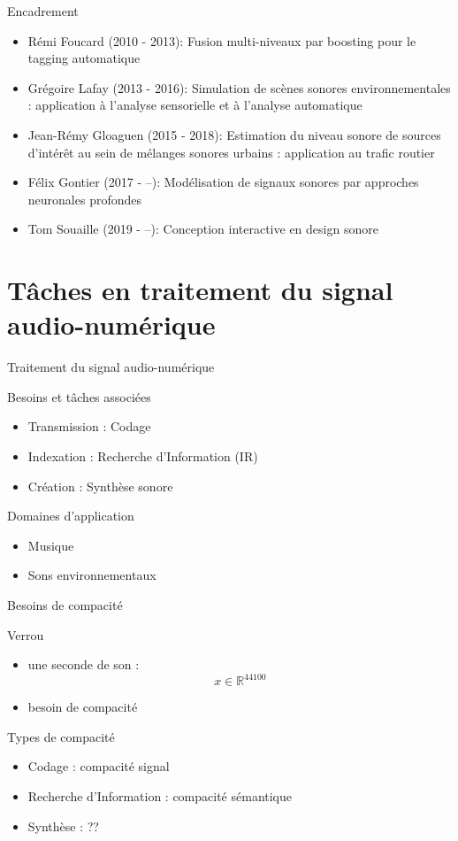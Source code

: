\documentclass[compress]{beamer}
\begin{document}
\begin{frame}{Encadrement}
\begin{itemize}
  \item Rémi Foucard (2010 - 2013): \og Fusion multi-niveaux par boosting pour le tagging automatique \fg
  \item Grégoire Lafay (2013 - 2016): \og Simulation de scènes sonores environnementales : application à l'analyse sensorielle et à l'analyse automatique \fg
  \item Jean-Rémy Gloaguen (2015 - 2018): \og Estimation du niveau sonore de sources d'intérêt au sein de mélanges sonores urbains : application au trafic routier \fg
  \item Félix Gontier (2017 - --): \og Modélisation de signaux sonores par approches neuronales profondes \fg
  \item Tom Souaille (2019 - --): \og Conception interactive en design sonore \fg
\end{itemize}
\end{frame}

\section[Tâches]{Tâches en traitement du signal audio-numérique}


\begin{frame}{Traitement du signal audio-numérique}
\begin{block}{Besoins et tâches associées}
\begin{itemize}
\item Transmission : Codage
\item Indexation : Recherche d'Information (IR)
\item Création : Synthèse sonore
\end{itemize}
\end{block}
\begin{block}{Domaines d'application}
\begin{itemize}
\item Musique
\item Sons environnementaux
\end{itemize}
\end{block}
\end{frame}


\begin{frame}{Besoins de compacité}
\begin{block}{Verrou}
\begin{itemize}
\item une seconde de son : $$ x \in \mathbb{R}^{44100}$$
\item besoin de compacité
\end{itemize}
\end{block}
\begin{block}{Types de compacité}
\begin{itemize}
\item Codage : compacité signal
\item Recherche d'Information : compacité sémantique
\item Synthèse : ??
\end{itemize}
\end{block}
\end{frame}
\end{document}
